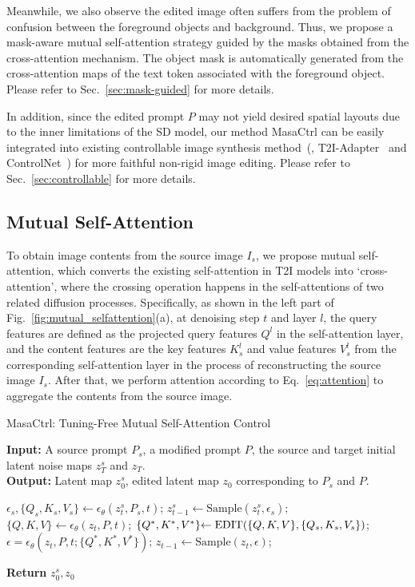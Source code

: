 \documentclass[10pt,twocolumn,letterpaper]{article}
\begin{document}
Meanwhile, we also observe the edited image often suffers from the problem of confusion between the foreground objects and background. Thus, we propose a mask-aware mutual self-attention strategy guided by the masks obtained from the cross-attention mechanism. The object mask is automatically generated from the cross-attention maps of the text token associated with the foreground object. Please refer to Sec.~\ref{sec:mask-guided} for more details.

In addition, since the edited prompt $P$ may not yield desired spatial layouts due to the inner limitations of the SD model, our method MasaCtrl can be easily integrated into existing controllable image synthesis method~(\eg, T2I-Adapter~\cite{mou2023t2i} and ControlNet~\cite{zhang2023adding}) for more faithful non-rigid image editing. Please refer to Sec.~\ref{sec:controllable} for more details.


\subsection{Mutual Self-Attention} \label{sec:mutual-self-attention}
To obtain image contents from the source image $I_s$, we propose mutual self-attention, which converts the existing self-attention in T2I models into `cross-attention', where the crossing operation happens in the self-attentions of two related diffusion processes.
Specifically, as shown in the left part of Fig.~\ref{fig:mutual_selfattention}(a), at denoising step $t$ and layer $l$, the query features are defined as the projected query features $Q^l$ in the self-attention layer, and the content features are the key features $K^l_s$ and value features $V^l_s$ from the corresponding self-attention layer in the process of reconstructing the source image $I_s$. After that, we perform attention according to Eq.~\ref{eq:attention} to aggregate the contents from the source image. 


\begin{algorithm}[!t]    
    \caption{MasaCtrl: Tuning-Free Mutual Self-Attention Control}
\textbf{Input:} A source prompt $P_s$, a modified prompt $P$, the source and target initial latent noise maps $z^s_T$ and $z_T$. \\
        \textbf{Output:} Latent map $z^s_0$, edited latent map $z_0$ corresponding to $P_s$ and $P$.
        \begin{algorithmic}[1]
                \STATE $\epsilon_s, \{Q_s, K_s, V_s\}\leftarrow \epsilon_\theta(z^s_t, P_s, t)$;
                \STATE $z^s_{t-1} \leftarrow \text{Sample}(z^{s}_{t}, \epsilon_s)$;
                \STATE $\{Q, K, V\} \leftarrow \epsilon_\theta(z_t,P,t)$;
                \STATE $\{Q^*, K^*, V^*\} \hspace{-1mm}\leftarrow \text{EDIT}(\{Q,K,V\}, \{Q_s, K_s, V_s\})$;
                \STATE $\epsilon = \epsilon_\theta(z_t, P, t; \{Q^*, K^*, V^*\})$;
                \STATE $z_{t-1} \leftarrow \text{Sample}(z_{t}, \epsilon)$;
            \ENDFOR
        \end{algorithmic}
        \label{alg:masactrl}
        \textbf{Return} $z^s_0, z_0$
\end{algorithm}
\end{document}
